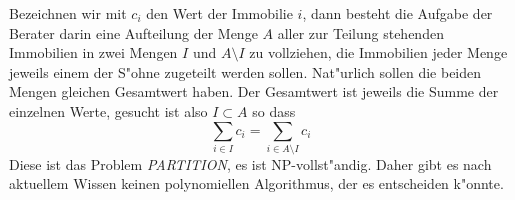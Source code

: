 Bezeichnen wir mit $c_i$ den Wert der Immobilie $i$, dann besteht
die Aufgabe der Berater darin eine Aufteilung der Menge $A$ aller 
zur Teilung stehenden Immobilien in zwei Mengen $I$ und $A\setminus I$
zu vollziehen, die Immobilien jeder Menge jeweils einem der S"ohne zugeteilt
werden sollen.
Nat"urlich sollen die beiden Mengen gleichen Gesamtwert haben.
Der Gesamtwert ist jeweils die Summe der einzelnen Werte, gesucht ist also
$I\subset A$ so dass
\[
\sum_{i\in I}c_i =\sum_{i\in A\setminus I}c_i
\]
Diese ist das Problem {\it PARTITION}, es ist NP-vollst"andig.
Daher gibt es nach aktuellem Wissen keinen polynomiellen Algorithmus,
der es entscheiden k"onnte.


